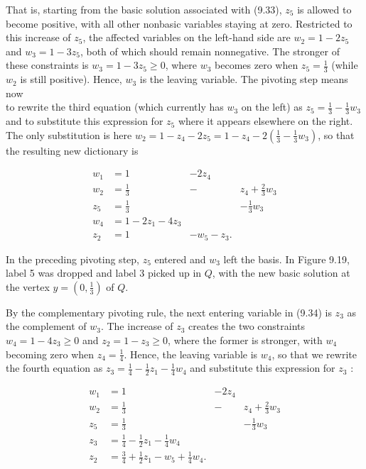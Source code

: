 \documentclass[12pt]{article}
\begin{document}
That is, starting from the basic solution associated with (9.33), $z_{5}$ is allowed to become positive, with all other nonbasic variables staying at zero. Restricted to this increase of $z_{5}$, the affected variables on the left-hand side are $w_{2}=1-2 z_{5}$ and $w_{3}=1-3 z_{5}$, both of which should remain nonnegative. The stronger of these constraints is $w_{3}=1-3 z_{5} \geq 0$, where $w_{3}$ becomes zero when $z_{5}=\frac{1}{3}$ (while $w_{2}$ is still positive). Hence, $w_{3}$ is the leaving variable. The pivoting step means now\\
to rewrite the third equation (which currently has $w_{3}$ on the left) as $z_{5}=\frac{1}{3}-\frac{1}{3} w_{3}$ and to substitute this expression for $z_{5}$ where it appears elsewhere on the right. The only substitution is here $w_{2}=1-z_{4}-2 z_{5}=1-z_{4}-2\left(\frac{1}{3}-\frac{1}{3} w_{3}\right)$, so that the resulting new dictionary is

\[
\begin{array}{rlrl}
w_{1} & =1 & -2 z_{4} & \\
w_{2} & =\frac{1}{3} & - & z_{4}+\frac{2}{3} w_{3} \\
z_{5} & =\frac{1}{3} & & -\frac{1}{3} w_{3}  \tag{9.34}\\
w_{4} & =1-2 z_{1}-4 z_{3} & \\
z_{2} & =1 & -w_{5}-z_{3} . &
\end{array}
\]

In the preceding pivoting step, $z_{5}$ entered and $w_{3}$ left the basis. In Figure 9.19, label 5 was dropped and label 3 picked up in $Q$, with the new basic solution at the vertex $y=\left(0, \frac{1}{3}\right)$ of $Q$.

By the complementary pivoting rule, the next entering variable in (9.34) is $z_{3}$ as the complement of $w_{3}$. The increase of $z_{3}$ creates the two constraints $w_{4}=1-4 z_{3} \geq 0$ and $z_{2}=1-z_{3} \geq 0$, where the former is stronger, with $w_{4}$ becoming zero when $z_{4}=\frac{1}{4}$. Hence, the leaving variable is $w_{4}$, so that we rewrite the fourth equation as $z_{3}=\frac{1}{4}-\frac{1}{2} z_{1}-\frac{1}{4} w_{4}$ and substitute this expression for $z_{3}$ :

\[
\begin{array}{rlrl}
w_{1} & =1 & -2 z_{4} & \\
w_{2} & =\frac{1}{3} & - & z_{4}+\frac{2}{3} w_{3} \\
z_{5} & =\frac{1}{3} & & -\frac{1}{3} w_{3}  \tag{9.35}\\
z_{3} & =\frac{1}{4}-\frac{1}{2} z_{1}-\frac{1}{4} w_{4} & \\
z_{2} & =\frac{3}{4}+\frac{1}{2} z_{1}-w_{5}+\frac{1}{4} w_{4} . &
\end{array}
\]
\end{document}

